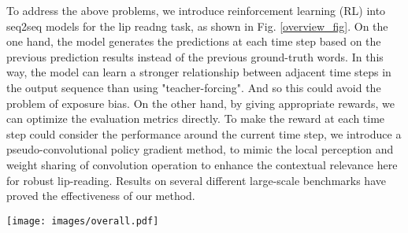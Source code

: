 \documentclass[a4paper, 10pt, conference]{ieeeconf}      %
\begin{document}
	To address the above problems, we introduce reinforcement learning (RL) into seq2seq models for the lip readng task, as shown in Fig. \ref{overview_fig}. 
	On the one hand, the model generates the predictions at each time step based on the previous prediction results instead of the previous ground-truth words. In this way, the model can learn a stronger relationship between adjacent time steps in the output sequence than using "teacher-forcing". And so this could avoid the problem of exposure bias. 
	On the other hand, by giving appropriate rewards, we can optimize the evaluation metrics directly. To make the reward at each time step could  consider the performance around the current time step, we introduce a pseudo-convolutional policy gradient method, to mimic the local perception and weight sharing of convolution operation to enhance the contextual relevance here for robust lip-reading. Results on several different large-scale benchmarks have proved the effectiveness of our method. 
	
	
	\begin{figure*}[htb]
		\setlength{\abovecaptionskip}{0.2cm}
		\setlength{\belowcaptionskip}{-0.3cm} 
		\centering
		\texttt{[image: images/overall.pdf]}
		\caption{Overview of our proposed PCPG based seq2seq model for lip-reading. In the model, the GRU decoder is regarded as an agent. And the ground truth is regarded as the environment. In the learning process, the agent would observe the old state generated from the previous time steps, and then takes an action to output a character/word at each current time-step to obtain a new state. The new state, the old state and the environment would together contribute to the reward for the action. Finally, the reward is feeded to the PCPG to generate the final loss when passed to the agent.}\label{overview_fig}
	\end{figure*}
	
\end{document}
